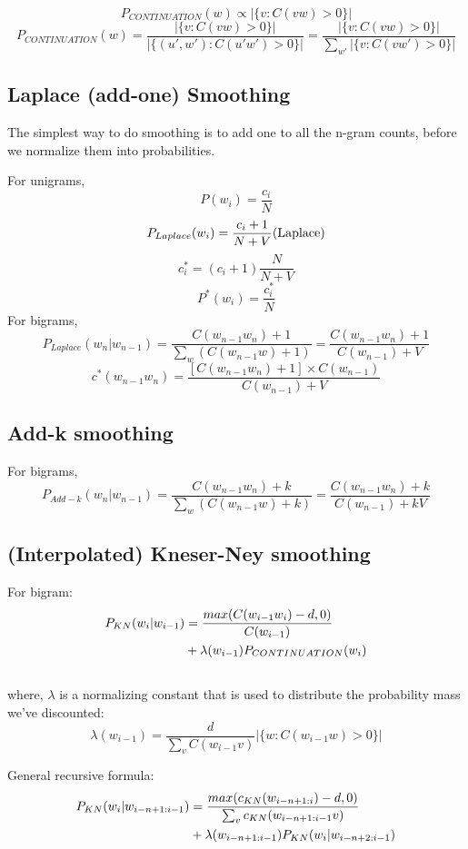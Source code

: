 \[
    P_{CONTINUATION}(w) \propto |\{v : C(vw) > 0\}|
\]
\[
    P_{CONTINUATION}(w) = \displaystyle\frac{|\{v : C(vw) > 0\}|}{|\{(u',w') : C(u'w') > 0\}| } = \displaystyle\frac{|\{v : C(vw) > 0\}|}{\sum_{w'} |\{v : C(vw') > 0\}|}
\]

\subsection{Laplace (add-one) Smoothing \cite{nlp-1}}
The simplest way to do smoothing is to add one to all the n-gram counts, before we normalize them into probabilities.

For unigrams,
\[
    P(w_i) = \displaystyle\frac{c_i}{N}
\]
\[
    P_{Laplace}(w_i) = \displaystyle\frac{c_i + 1}{N + V} \hfill \text{(Laplace)}
\]
\[
    c_i^* = (c_i +1)\displaystyle\frac{N}{N + V}
\]
\[
    P^*(w_i) = \displaystyle\frac{c_i^*}{N}
\]
For bigrams,
\[
    P_{Laplace}(w_n|w_{n-1}) = \displaystyle\frac{C(w_{n-1}w_n) + 1}{\sum_w (C(w_{n-1}w) + 1)} = \displaystyle\frac{C(w_{n-1}w_n) + 1}{C(w_{n-1}) + V} 
\]
\[
    c^*(w_{n-1}w_n) = \displaystyle\frac{[C(w_{n-1}w_n)+1] \times C(w_{n-1})}{C(w_{n-1}) + V} 
\]

\subsection{Add-k smoothing \cite{nlp-1}}

For bigrams,
\[
    P_{Add-k}(w_n|w_{n-1}) = \displaystyle\frac{C(w_{n-1}w_n) + k}{\sum_w (C(w_{n-1}w) + k)} = \displaystyle\frac{C(w_{n-1}w_n) + k}{C(w_{n-1}) + kV} 
\]

\subsection{(Interpolated) Kneser-Ney smoothing}

For bigram:
\begin{align}
    P_{KN}(w_i|w_{i-1}) \notag &= \displaystyle\frac{max(C(w_{i-1}w_i)-d,0)}{C(w_{i-1})} \\ \notag
    &+ \lambda (w_{i-1})P_{CONTINUATION}(w_i) \\ \notag
\end{align}
where, $\lambda$ is a normalizing constant that is used to distribute the probability mass we’ve discounted:
\[
    \lambda(w_{i-1}) = \displaystyle\frac{d}{\sum_v C(w_{i-1}v)} |\{w : C(w_{i-1}w) > 0\}|
\]

General recursive formula:
\begin{align}
    P_{KN}(w_i|w_{i-n+1:i-1}) \notag &= \displaystyle\frac{max(c_{KN}(w_{i-n+1:i})-d,0)}{\sum_v c_{KN}(w_{i-n+1:i-1} v)} \\ \notag
    &+ \lambda (w_{i-n+1:i-1})P_{KN}(w_i|w_{i-n+2:i-1}) \notag
\end{align}

